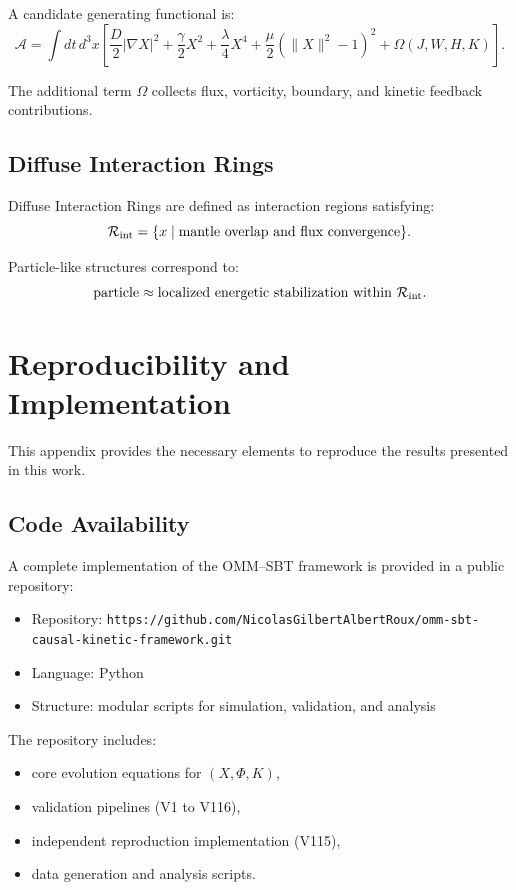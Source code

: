 \documentclass[11pt]{article}
\begin{document}
A candidate generating functional is:
\[
\mathcal A
=
\int dt\,d^3x
\left[
\frac{D}{2}|\nabla X|^2
+
\frac{\gamma}{2}X^2
+
\frac{\lambda}{4}X^4
+
\frac{\mu}{2}(\|X\|^2-1)^2
+
\Omega(J,W,H,K)
\right].
\]

The additional term $\Omega$ collects flux, vorticity, boundary, and kinetic feedback contributions.

\subsection{Diffuse Interaction Rings}

Diffuse Interaction Rings are defined as interaction regions satisfying:
\[
\mathcal R_{\rm int}
=
\{x\mid \text{mantle overlap and flux convergence}\}.
\]

Particle-like structures correspond to:
\[
\text{particle}
\approx
\text{localized energetic stabilization within } \mathcal R_{\rm int}.
\]

\section{Reproducibility and Implementation}

This appendix provides the necessary elements to reproduce the results presented in this work.

\subsection{Code Availability}

A complete implementation of the OMM--SBT framework is provided in a public repository:

\begin{itemize}
\item Repository: \texttt{https://github.com/NicolasGilbertAlbertRoux/omm-sbt-causal-kinetic-framework.git}
\item Language: Python
\item Structure: modular scripts for simulation, validation, and analysis
\end{itemize}

The repository includes:

\begin{itemize}
\item core evolution equations for $(X, \Phi, K)$,
\item validation pipelines (V1 to V116),
\item independent reproduction implementation (V115),
\item data generation and analysis scripts.
\end{itemize}
\end{document}
